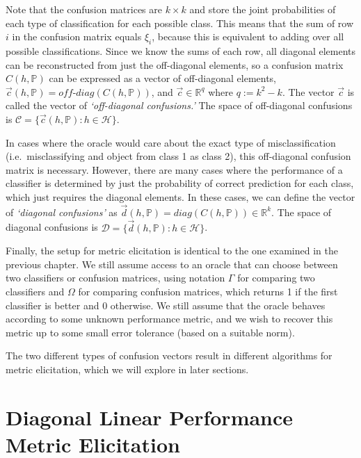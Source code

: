 \documentclass[
  letterpaper,
  numbers=noenddot,
  DIV=11,
  oneside]{scrreprt}
\theoremstyle{remark}
\begin{document}
Note that the confusion matrices are \(k\times k\) and store the joint
probabilities of each type of classification for each possible class.
This means that the sum of row \(i\) in the confusion matrix equals
\(\xi_i\), because this is equivalent to adding over all possible
classifications. Since we know the sums of each row, all diagonal
elements can be reconstructed from just the off-diagonal elements, so a
confusion matrix \(C(h, \mathbb{P})\) can be expressed as a vector of
off-diagonal elements,
\(\vec{c}(h, \mathbb{P}) = \textit{off-diag}(C(h, \mathbb{P}))\), and
\(\vec{c} \in \mathbb{R}^q\) where \(q := k^2 - k\). The vector
\(\vec{c}\) is called the vector of \emph{`off-diagonal confusions.'}
The space of off-diagonal confusions is
\(\mathcal{C} = \{\vec{c}(h, \mathbb{P}) : h \in \mathcal{H}\}\).

In cases where the oracle would care about the exact type of
misclassification (i.e.~misclassifying and object from class 1 as class
2), this off-diagonal confusion matrix is necessary. However, there are
many cases where the performance of a classifier is determined by just
the probability of correct prediction for each class, which just
requires the diagonal elements. In these cases, we can define the vector
of \emph{`diagonal confusions'} as
\(\vec{d}(h, \mathbb{P}) = \textit{diag}(C(h, \mathbb{P})) \in \mathbb{R}^k\).
The space of diagonal confusions is
\(\mathcal{D} = \{\vec{d}(h, \mathbb{P}) : h \in \mathcal{H}\}\).

Finally, the setup for metric elicitation is identical to the one
examined in the previous chapter. We still assume access to an oracle
that can choose between two classifiers or confusion matrices, using
notation \(\Gamma\) for comparing two classifiers and \(\Omega\) for
comparing confusion matrices, which returns 1 if the first classifier is
better and 0 otherwise. We still assume that the oracle behaves
according to some unknown performance metric, and we wish to recover
this metric up to some small error tolerance (based on a suitable norm).

The two different types of confusion vectors result in different
algorithms for metric elicitation, which we will explore in later
sections.

\section{Diagonal Linear Performance Metric
Elicitation}\label{diagonal-linear-performance-metric-elicitation}
\end{document}
